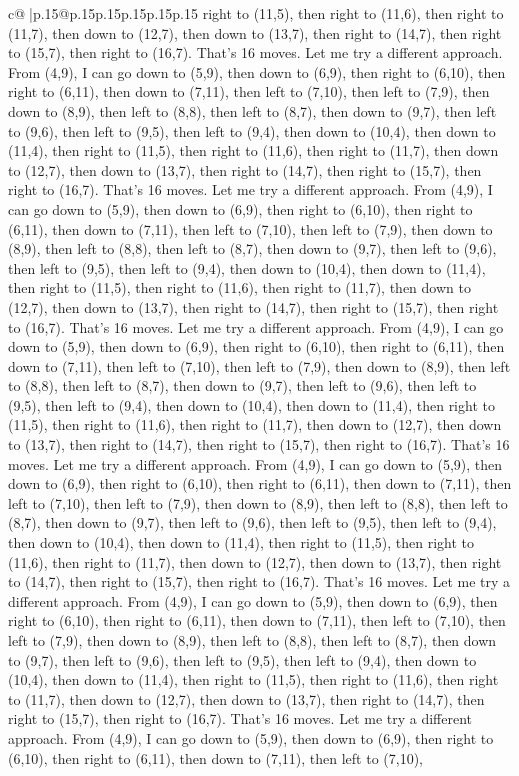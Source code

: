 \documentclass{article}
\begin{document}
{\begin{supertabular}{c@{$\;$}|p{.15\linewidth}@{}p{.15\linewidth}p{.15\linewidth}p{.15\linewidth}p{.15\linewidth}p{.15\linewidth}}
{{{right to (11,5), then right to (11,6), then right to (11,7), then down to (12,7), then down to (13,7), then right to (14,7), then right to (15,7), then right to (16,7). That's 16 moves. Let me try a different approach. From (4,9), I can go down to (5,9), then down to (6,9), then right to (6,10), then right to (6,11), then down to (7,11), then left to (7,10), then left to (7,9), then down to (8,9), then left to (8,8), then left to (8,7), then down to (9,7), then left to (9,6), then left to (9,5), then left to (9,4), then down to (10,4), then down to (11,4), then right to (11,5), then right to (11,6), then right to (11,7), then down to (12,7), then down to (13,7), then right to (14,7), then right to (15,7), then right to (16,7). That's 16 moves. Let me try a different approach. From (4,9), I can go down to (5,9), then down to (6,9), then right to (6,10), then right to (6,11), then down to (7,11), then left to (7,10), then left to (7,9), then down to (8,9), then left to (8,8), then left to (8,7), then down to (9,7), then left to (9,6), then left to (9,5), then left to (9,4), then down to (10,4), then down to (11,4), then right to (11,5), then right to (11,6), then right to (11,7), then down to (12,7), then down to (13,7), then right to (14,7), then right to (15,7), then right to (16,7). That's 16 moves. Let me try a different approach. From (4,9), I can go down to (5,9), then down to (6,9), then right to (6,10), then right to (6,11), then down to (7,11), then left to (7,10), then left to (7,9), then down to (8,9), then left to (8,8), then left to (8,7), then down to (9,7), then left to (9,6), then left to (9,5), then left to (9,4), then down to (10,4), then down to (11,4), then right to (11,5), then right to (11,6), then right to (11,7), then down to (12,7), then down to (13,7), then right to (14,7), then right to (15,7), then right to (16,7). That's 16 moves. Let me try a different approach. From (4,9), I can go down to (5,9), then down to (6,9), then right to (6,10), then right to (6,11), then down to (7,11), then left to (7,10), then left to (7,9), then down to (8,9), then left to (8,8), then left to (8,7), then down to (9,7), then left to (9,6), then left to (9,5), then left to (9,4), then down to (10,4), then down to (11,4), then right to (11,5), then right to (11,6), then right to (11,7), then down to (12,7), then down to (13,7), then right to (14,7), then right to (15,7), then right to (16,7). That's 16 moves. Let me try a different approach. From (4,9), I can go down to (5,9), then down to (6,9), then right to (6,10), then right to (6,11), then down to (7,11), then left to (7,10), then left to (7,9), then down to (8,9), then left to (8,8), then left to (8,7), then down to (9,7), then left to (9,6), then left to (9,5), then left to (9,4), then down to (10,4), then down to (11,4), then right to (11,5), then right to (11,6), then right to (11,7), then down to (12,7), then down to (13,7), then right to (14,7), then right to (15,7), then right to (16,7). That's 16 moves. Let me try a different approach. From (4,9), I can go down to (5,9), then down to (6,9), then right to (6,10), then right to (6,11), then down to (7,11), then left to (7,10), }}}
\end{supertabular}}
\end{document}
